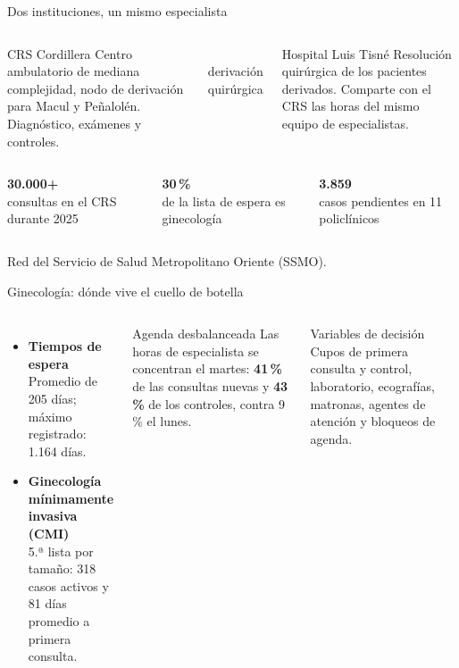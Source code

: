 \documentclass[aspectratio=169,11pt,xcolor=table]{beamer}
\newcommand{\bignum}[2]{%
  \begin{minipage}[t]{\linewidth}\centering
    {\Huge\bfseries\color{ucnavy}#1}\\[4pt]
    {\small #2}
  \end{minipage}}
\begin{document}
\begin{frame}{Dos instituciones, un mismo especialista}
  \begin{columns}[T]
      \begin{block}{CRS Cordillera}
        Centro ambulatorio de mediana complejidad, nodo de derivación para Macul
        y Peñalolén. Diagnóstico, exámenes y controles.
      \end{block}
      \centering\vspace{.8cm}
      \\
      {\scriptsize derivación quirúrgica}
      \begin{block}{Hospital Luis Tisné}
        Resolución quirúrgica de los pacientes derivados. Comparte con el CRS las
        horas del mismo equipo de especialistas.
      \end{block}
  \end{columns}
  \vspace{1em}
  \begin{columns}[T]
    \bignum{30.000+}{consultas en el CRS durante 2025}
    \bignum{30\,\%}{de la lista de espera es ginecología}
    \bignum{3.859}{casos pendientes en 11 policlínicos}
  \end{columns}
  \vfill
  {\scriptsize Red del Servicio de Salud Metropolitano Oriente (SSMO).}
\end{frame}

\begin{frame}{Ginecología: dónde vive el cuello de botella}
  \begin{columns}[T]
      \begin{itemize}
        \item \textbf{Tiempos de espera}\\
          Promedio de 205 días; máximo registrado: 1.164 días.
        \item \textbf{Ginecología mínimamente invasiva (CMI)}\\
          5.ª lista por tamaño: 318 casos activos y 81 días promedio a primera consulta.
      \end{itemize}
      \begin{block}{Agenda desbalanceada}
        Las horas de especialista se concentran el martes: \textbf{41\,\%} de las
        consultas nuevas y \textbf{43\,\%} de los controles, contra 9\,\% el lunes.
      \end{block}
      \begin{block}{Variables de decisión}
        Cupos de primera consulta y control, laboratorio, ecografías, matronas,
        agentes de atención y bloqueos de agenda.
      \end{block}
  \end{columns}
\end{frame}
\end{document}
